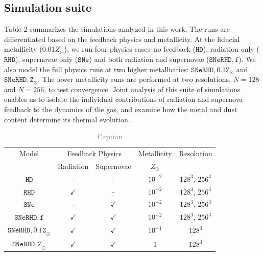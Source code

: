 \documentclass[twocolumn,linenumbers]{aastex631}
\begin{document}



\subsection{Simulation suite}
Table 2 summarizes the simulations analyzed in this work. The runs are differentiated based on the feedback physics and metallicity. At the fiducial metallicity ($0.01Z_\odot$), we run four physics cases--no feedback ($\mathtt{HD}$), radiation only ($\mathtt{RHD}$), supernovae only ($\mathtt{SNe}$) and both radiation and supernovae ($\mathtt{SNeRHD,f}$). We also model the full physics runs at two higher metallicities: $\mathtt{SNeRHD,0.1Z_\odot}$ and $\mathtt{SNeRHD,Z_\odot}$. The lower metallicity runs are performed at two resolutions, $N = 128$ and $N = 256$, to test convergence. 
Joint analysis of this suite of simulations enables us to isolate the individual contributions of radiation and supernova feedback to the dynamics of the gas, and examine how the metal and dust content determine its thermal evolution.\\

\begin{table}
    \centering
    \begin{tabular}{|c||c|c||c|c|}
    \hline
 Model& \multicolumn{2}{c|}{Feedback Physics}& Metallicity&Resolution\\
      &  Radiation &   Supernovae & $Z_\odot$& \\
     \hline 
     \hline
     $\mathtt{HD}$ &  -&   -&$10^{-2}$& $128^3$, $256^3$\\
     $\mathtt{RHD}$ &  $\checkmark$&   -&$10^{-2}$& $128^3$, $256^3$\\
     $\mathtt{SNe}$ &  -&   $\checkmark$&$10^{-2}$& $128^3$, $256^3$\\
     $\mathtt{SNeRHD,f}$&  $\checkmark$&   $\checkmark$&$10^{-2}$& $128^3$, $256^3$\\
 $\mathtt{SNeRHD,0.1Z}_\odot$& $\checkmark$& $\checkmark$&  $10^{-1}$&$128^3$\\
 $\mathtt{SNeRHD,Z}_\odot$& $\checkmark$& $\checkmark$& 1&$128^3$\\
 \hline
    \end{tabular}
    \caption{\textcolor{gray}{Caption}}
    \label{tab:tab1}
\end{table}
\end{document}
